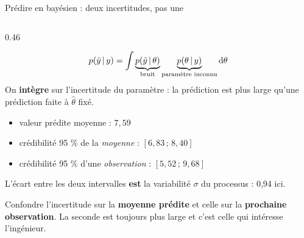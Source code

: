 \begin{frame}{Prédire en bayésien : deux incertitudes, pas une}
\begin{columns}[t]
\begin{column}{0.46\textwidth}
\begin{kbox}
\[
p(\tilde y \,\vert\, y) = \int \underbrace{p(\tilde y \,\vert\, \theta)}_{\text{bruit}}
\underbrace{p(\theta \,\vert\, y)}_{\text{paramètre inconnu}} \mathrm{d}\theta
\]
On \textbf{intègre} sur l'incertitude du paramètre : la prédiction est
plus large qu'une prédiction faite à $\hat\theta$ fixé.
\end{kbox}
\begin{ebox}[Chiffres réels à $x = 8$]
\begin{itemize}
  \item valeur prédite moyenne : $7{,}59$
  \item crédibilité 95 \% de la \emph{moyenne} : $[6{,}83 \,;\, 8{,}40]$
  \item crédibilité 95 \% d'une \emph{observation} : $[5{,}52 \,;\, 9{,}68]$
\end{itemize}
\vspace{1mm}
\small L'écart entre les deux intervalles \textbf{est} la variabilité
$\sigma$ du processus : 0,94 ici.
\end{ebox}
\begin{wbox}
Confondre l'incertitude sur la \textbf{moyenne prédite} et celle sur la
\textbf{prochaine observation}. La seconde est toujours plus large et
c'est celle qui intéresse l'ingénieur.
\end{wbox}
\end{column}
\end{columns}
\end{frame}

